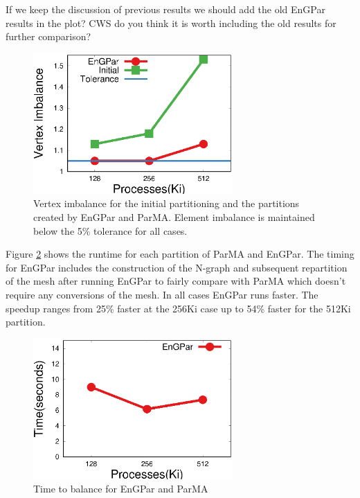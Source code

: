 \documentclass[conference]{IEEEtran}
\begin{document}
{\color{red} If we keep the discussion of previous results we should add the old EnGPar results in the plot? CWS do you think it is worth including the old results for further comparison?}
\begin{figure}[!ht]
  \centering
  \includegraphics[width=3in]{plots/mira_fem_results/vimb_v_cores}
  \caption{Vertex imbalance for the initial partitioning and the partitions created by
    EnGPar and ParMA. Element imbalance is maintained below the 5\% tolerance for all cases.}
  \label{fig:fem_vtximb}
\end{figure}

Figure \ref{fig:fem_time} shows the runtime for each partition of ParMA and EnGPar. The
timing for EnGPar includes the construction of the N-graph and subsequent repartition of
the mesh after running EnGPar to fairly compare with ParMA which doesn't require any
conversions of the mesh. In all cases EnGPar runs faster. The speedup ranges from
25\% faster at the 256Ki case up to 54\% faster for the 512Ki partition.

\begin{figure}[!ht]
  \centering
  \includegraphics[width=3in]{plots/mira_fem_results/time_v_cores}
  \caption{Time to balance for EnGPar and ParMA}
  \label{fig:fem_time}
\end{figure}
\end{document}
